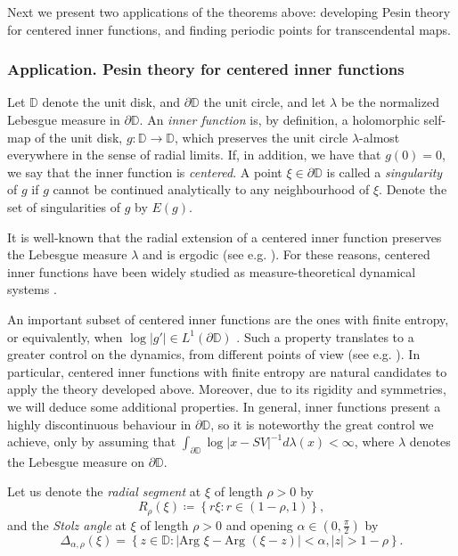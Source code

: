 \documentclass[11pt]{article}
\theoremstyle{definition}
\theoremstyle{remark}
\theoremstyle{plain}
\begin{document}
Next we present two applications of the theorems above:  developing Pesin theory for centered inner functions, and finding periodic points for transcendental maps.

\subsubsection*{Application. Pesin theory for centered inner functions}
 Let $ \mathbb{D} $ denote the unit disk, and $\partial  \mathbb{D} $ the unit circle, and let $ \lambda $ be the normalized Lebesgue measure in $ \partial\mathbb{D} $.
An \textit{inner function} is, by definition, a holomorphic self-map of the unit disk, $ g\colon\mathbb{D}\to\mathbb{D} $, which preserves
 the unit circle $ \lambda $-almost everywhere in the sense of radial limits.  If, in addition, we have that $ g(0)=0 $, we say that the inner function is \textit{centered}. A point $ \xi\in\partial\mathbb{D} $ is called a {\em singularity} of $ g $ if $ g $ cannot be continued analytically to any neighbourhood of $ \xi $. Denote the set of singularities of $ g $ by $ E(g) $.
 
 It is well-known that the radial extension of a centered inner function preserves the Lebesgue measure $ \lambda $ and is ergodic (see e.g. \cite[Thm. A, B]{DoeringMane1991}). For these reasons, centered inner functions have been widely studied as measure-theoretical dynamical systems
 \cite{Aaronson, DoeringMane1991,Craizer,Craizer2, Aaronson97, ivrii2023inner, ivriiurbanskiNOU}. 
 
 An important subset of centered inner functions are the ones with finite entropy, or equivalently, when $ \log \left| g'\right|\in L^1(\partial\mathbb{D})$  \cite{Craizer}. Such a property translates to a greater control on the dynamics, from different points of view (see e.g. \cite{Craizer, Craizer2, ivrii2023inner, ivriiurbanskiNOU}).
In particular, centered  inner functions with finite entropy are natural candidates to apply the theory developed above. Moreover, due to its rigidity and symmetries, we will deduce some additional properties. 
In general, inner functions present a highly discontinuous behaviour in $ \partial\mathbb{D} $, so it is noteworthy the great control we achieve, only by assuming that $ \int_{\partial \mathbb{D}} \log\left| x-SV\right|^{-1} d\lambda(x)<\infty  $, where $ \lambda $ denotes the Lebesgue measure on $ \partial\mathbb{D} $.



Let us denote the \textit{radial segment} at $ \xi $ of length $ \rho>0 $ by \[R_{\rho}(\xi)\coloneqq \left\lbrace r\xi\colon r\in(1-\rho,1)\right\rbrace ,\]
and  the \textit{Stolz angle} at $ \xi $ of length $ \rho>0 $ and opening $ \alpha\in (0, \frac{\pi}{2}) $ by 	\[\Delta_{\alpha, \rho}(\xi)=\left\lbrace z\in\mathbb{D}\colon \left| \textrm{Arg }\xi- \textrm{Arg }(\xi-z)\right| <\alpha, \left| z \right| >1-\rho \right\rbrace .\] 
\end{document}

